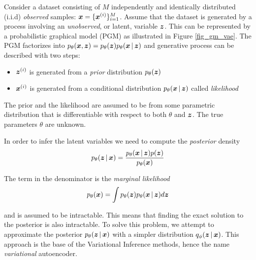Consider a dataset consisting of $M$ independently and identically distributed (i.i.d) \textit{observed} samples: $\boldsymbol{x} = \{\boldsymbol{x}^{(i)}\}^M_{i=1}$. Assume that the dataset is generated by a process involving an \textit{unobserved}, or latent, variable $\boldsymbol{z}$. This can be represented by a probabilistic graphical model (PGM) as illustrated in Figure \ref{fig_gm_vae}. The PGM factorizes into $\ptheta (\vx, \vz) = \ptheta (\vz) \ptheta \given{\vx}{\vz}$ and generative process can be described with two steps:

\begin{itemize}
    \item $\boldsymbol{z}^{(i)}$ is generated from a \textit{prior} distribution $p_{\theta}(\boldsymbol{z})$
    \item $\boldsymbol{x}^{(i)}$ is generated from a conditional distribution $p_{\theta}\given{\vx}{\vz}$ called \textit{likelihood}
\end{itemize}
%
The prior and the likelihood are assumed to be from some parametric distribution that is differentiable with respect to both $\theta$ and $\boldsymbol{z}$. The true parameters $\theta$ are unknown.

In order to infer the latent variables we need to compute the \textit{posterior} density
\begin{equation}
p_{\theta}\given{\vz}{\vx} = \frac{p_{\theta}\given{\vx}{\vz}p(\vz)}{p_{\theta}(\vx)}
\end{equation}

The term in the denominator is the \emph{marginal likelihood}
\begin{equation}
p_{\theta}(\vx) = \int p_{\theta}(\vz)p_{\theta}\given{\vx}{\vz} d\vz
\label{eq:maximize_vae}
\end{equation}

and is assumed to be intractable. This means that finding the exact solution to the posterior is also intractable. To solve this problem, we attempt to approximate the posterior $\ptheta \given{\vz}{\vx}$ with a simpler distribution $\qphi \given{\vz}{\vx}$. This approach is the base of the Variational Inference methods, hence the name \textit{variational} autoencoder.

